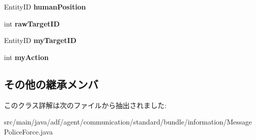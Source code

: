 \begin{DoxyCompactItemize}
Entity\+ID {\bfseries human\+Position}
\item 
\hypertarget{classadf_1_1agent_1_1communication_1_1standard_1_1bundle_1_1information_1_1MessagePoliceForce_a217cbd77bc507a5085e73ab5615c1200}{}\label{classadf_1_1agent_1_1communication_1_1standard_1_1bundle_1_1information_1_1MessagePoliceForce_a217cbd77bc507a5085e73ab5615c1200} 
int {\bfseries raw\+Target\+ID}
\item 
\hypertarget{classadf_1_1agent_1_1communication_1_1standard_1_1bundle_1_1information_1_1MessagePoliceForce_a3a8e395c0f856d483352ef8fb399159f}{}\label{classadf_1_1agent_1_1communication_1_1standard_1_1bundle_1_1information_1_1MessagePoliceForce_a3a8e395c0f856d483352ef8fb399159f} 
Entity\+ID {\bfseries my\+Target\+ID}
\item 
\hypertarget{classadf_1_1agent_1_1communication_1_1standard_1_1bundle_1_1information_1_1MessagePoliceForce_a30763f7e77021d0f06c6bf30d698cae9}{}\label{classadf_1_1agent_1_1communication_1_1standard_1_1bundle_1_1information_1_1MessagePoliceForce_a30763f7e77021d0f06c6bf30d698cae9} 
int {\bfseries my\+Action}
\end{DoxyCompactItemize}
\subsection*{その他の継承メンバ}


このクラス詳解は次のファイルから抽出されました\+:\begin{DoxyCompactItemize}
\item 
src/main/java/adf/agent/communication/standard/bundle/information/Message\+Police\+Force.\+java\end{DoxyCompactItemize}
